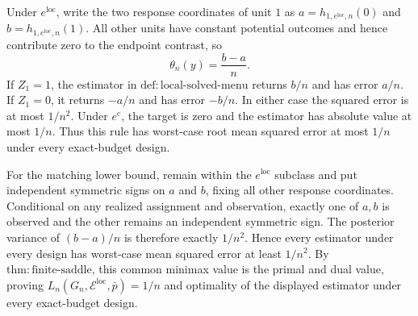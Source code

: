 Under \(e^{\mathrm{loc}}\), write the two response coordinates of unit \(1\) as \(a=h_{1,e^{\mathrm{loc}},n}(0)\) and \(b=h_{1,e^{\mathrm{loc}},n}(1)\).  All other units have constant potential outcomes and hence contribute zero to the endpoint contrast, so
\[
 \theta_n(y)=\frac{b-a}{n}.
\]
If \(Z_1=1\), the estimator in \(\mathrm{def{:}local\text{-}solved\text{-}menu}\) returns \(b/n\) and has error \(a/n\).  If \(Z_1=0\), it returns \(-a/n\) and has error \(-b/n\).  In either case the squared error is at most \(1/n^2\).  Under \(e^{\mathrm c}\), the target is zero and the estimator has absolute value at most \(1/n\).  Thus this rule has worst-case root mean squared error at most \(1/n\) under every exact-budget design.

For the matching lower bound, remain within the \(e^{\mathrm{loc}}\) subclass and put independent symmetric signs on \(a\) and \(b\), fixing all other response coordinates.  Conditional on any realized assignment and observation, exactly one of \(a,b\) is observed and the other remains an independent symmetric sign.  The posterior variance of \((b-a)/n\) is therefore exactly \(1/n^2\).  Hence every estimator under every design has worst-case mean squared error at least \(1/n^2\).  By \(\mathrm{thm{:}finite\text{-}saddle}\), this common minimax value is the primal and dual value, proving \(L_n(G_n,\mathcal E^{\mathrm{loc}},\bar p)=1/n\) and optimality of the displayed estimator under every exact-budget design.